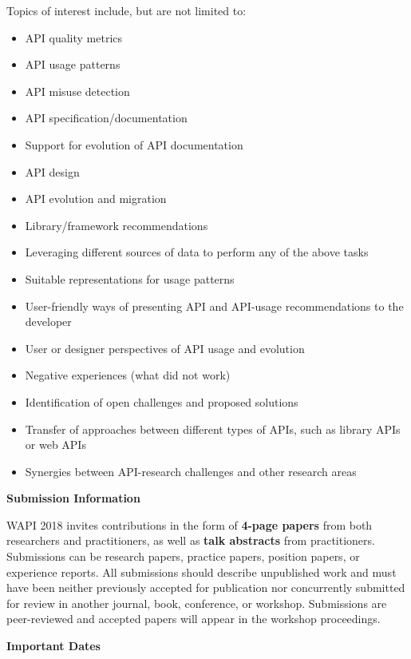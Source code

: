 \documentclass[10pt, conference]{IEEEtran}
\newcommand{\shortname}{WAPI}
\begin{document}
Topics of interest include, but are not limited to:
\begin{itemize}
\setlength\itemsep{5pt}

\item API quality metrics
\item API usage patterns
\item API misuse detection
\item API specification/documentation
\item Support for evolution of API documentation
\item API design
\item API evolution and migration
\item Library/framework recommendations
\item Leveraging different sources of data to perform any of the above tasks
\item Suitable representations for usage patterns
\item User-friendly ways of presenting API and API-usage recommendations to the developer
\item User or designer perspectives of API usage and evolution
\item Negative experiences (what did not work)
\item Identification of open challenges and proposed solutions
\item Transfer of approaches between different types of APIs, such as library APIs or web APIs
\item Synergies between API-research challenges and other research areas  
\end{itemize}


\vspace{0.2cm}
\noindent
\textbf{\large Submission Information}
\vspace{0.2cm}

\shortname{} 2018 invites contributions in the form of \textbf{4-page papers} from both researchers and practitioners, as well as \textbf{talk abstracts} from practitioners. Submissions can be research papers, practice papers, position papers, or experience reports. All submissions should describe unpublished work and must have been neither previously accepted for publication nor concurrently submitted for review in another journal, book, conference, or workshop. Submissions are peer-reviewed and accepted papers will appear in the workshop proceedings.

\vspace{0.2cm}
\noindent
\textbf{\large Important Dates}
\vspace{0.2cm}
\end{document}
